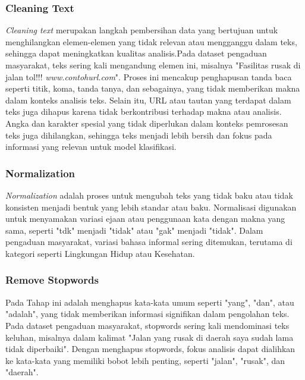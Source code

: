 \documentclass[12pt,a4paper]{article}
\begin{document}
\subsubsection{Cleaning Text}
\begin{adjustwidth}{3em}{0pt} \hspace{0.5cm} \textit{Cleaning text} merupakan langkah pembersihan data yang bertujuan untuk menghilangkan elemen-elemen yang tidak relevan atau mengganggu dalam teks, sehingga dapat meningkatkan kualitas analisis.Pada dataset pengaduan masyarakat, teks sering kali mengandung elemen ini, misalnya "Fasilitas rusak di jalan tol!!! \textit{www.contohurl.com}". Proses ini mencakup penghapusan tanda baca seperti titik, koma, tanda tanya, dan sebagainya, yang tidak memberikan makna dalam konteks analisis teks. Selain itu, URL atau tautan yang terdapat dalam teks juga dihapus karena tidak berkontribusi terhadap makna atau analisis. Angka dan karakter spesial yang tidak diperlukan dalam konteks pemrosesan teks juga dihilangkan, sehingga teks menjadi lebih bersih dan fokus pada informasi yang relevan untuk model klasifikasi. \end{adjustwidth}

\subsubsection{Normalization}
\begin{adjustwidth}{3em}{0pt} \hspace{0.5cm} \textit{Normalization} adalah proses untuk mengubah teks yang tidak baku atau tidak konsisten menjadi bentuk yang lebih standar atau baku. Normalisasi digunakan untuk menyamakan variasi ejaan atau penggunaan kata dengan makna yang sama, seperti "tdk" menjadi "tidak" atau "gak" menjadi "tidak". Dalam pengaduan masyarakat, variasi bahasa informal sering ditemukan, terutama di kategori seperti Lingkungan Hidup atau Kesehatan. \end{adjustwidth}

\subsubsection{Remove Stopwords}
\begin{adjustwidth}{3em}{0pt} \hspace{0.5cm} Pada Tahap ini adalah menghapus kata-kata umum seperti "yang", "dan", atau "adalah", yang tidak memberikan informasi signifikan dalam pengolahan teks. Pada dataset pengaduan masyarakat, stopwords sering kali mendominasi teks keluhan, misalnya dalam kalimat "Jalan yang rusak di daerah saya sudah lama tidak diperbaiki". Dengan menghapus stopwords, fokus analisis dapat dialihkan ke kata-kata yang memiliki bobot lebih penting, seperti "jalan", "rusak", dan "daerah".\end{adjustwidth}
\end{document}
